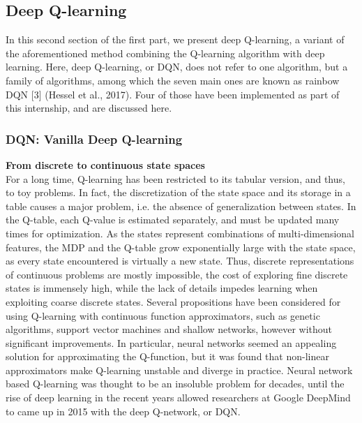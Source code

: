 \subsection{Deep Q-learning} \label{basics}

In this second section of the first part, we present deep Q-learning, a variant of the aforementioned method combining the Q-learning algorithm with deep learning. Here, deep Q-learning, or DQN, does not refer to one algorithm, but a family of algorithms, among which the seven main ones are known as rainbow DQN [3] (Hessel et al., 2017). Four of those have been implemented as part of this internship, and are discussed here.

\subsubsection{DQN: Vanilla Deep Q-learning} \label{basics}

\textbf{From discrete to continuous state spaces} \\
For a long time, Q-learning has been restricted to its tabular version, and thus, to toy problems. In fact, the discretization of the state space and its storage in a table causes a major problem, i.e. the absence of generalization between states. In the Q-table, each Q-value is estimated separately, and must be updated many times for optimization. As the states represent combinations of multi-dimensional features, the MDP and the Q-table grow exponentially large with the state space, as every state encountered is virtually a new state. Thus, discrete representations of continuous problems are mostly impossible, the cost of exploring fine discrete states is immensely high, while the lack of details impedes learning when exploiting coarse discrete states. Several propositions have been considered for using Q-learning with continuous function approximators, such as genetic algorithms, support vector machines and shallow networks, however without significant improvements. In particular, neural networks seemed an appealing solution for approximating the Q-function, but it was found that non-linear approximators make Q-learning unstable and diverge in practice. Neural network based Q-learning was thought to be an insoluble problem for decades, until the rise of deep learning in the recent years allowed researchers at Google DeepMind to came up in 2015 with the deep Q-network, or DQN. \\

